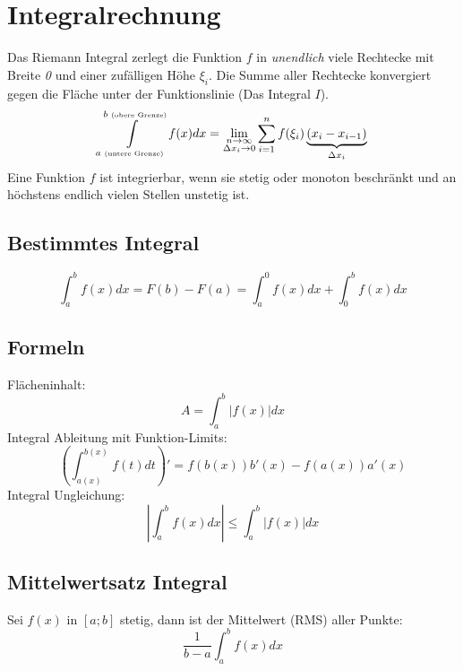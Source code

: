 \section{Integralrechnung}
Das Riemann Integral zerlegt die Funktion $f$ in \textit{unendlich} viele Rechtecke mit Breite \textit{0} und einer zufälligen Höhe $\xi_i$. Die Summe aller Rechtecke konvergiert gegen die Fläche unter der Funktionslinie (Das Integral $I$).
\[
\int\limits_{a \text{ \tiny(untere Grenze)}}^{b \text{ \tiny(obere Grenze)}}f(x)dx = \lim_{\substack{n\to\infty\\\Delta x_i\to 0}} \sum\limits_{i = 1}^{n}f(\xi_i)\underbrace{(x_i - x_{i-1})}_{\Delta x_i}
\]
\noindent Eine Funktion $f$ ist integrierbar, wenn sie stetig oder monoton beschränkt und an höchstens endlich vielen Stellen unstetig ist.

\subsection{Bestimmtes Integral}
\[\int_{a}^{b}f(x)dx = F(b) - F(a) = \int_{a}^{0}f(x)dx + \int_{0}^{b}f(x)dx\]

\subsection{Formeln}
\noindent Flächeninhalt: \[A = \int_{a}^{b}\left|f(x)\right|dx\]
\noindent Integral Ableitung mit Funktion-Limits: \[\left(\int_{a(x)}^{b(x)}f(t)dt\right)' = f(b(x))b'(x) - f(a(x))a'(x)\]
\noindent Integral Ungleichung:
\[\left|\int_{a}^{b}f(x)dx\right| \leq \int_{a}^{b}\left|f(x)\right|dx\]

\subsection{Mittelwertsatz Integral}
Sei $f(x)$ in $[a;b]$ stetig, dann ist der Mittelwert (RMS) aller Punkte:
\[\frac{1}{b-a}\int_{a}^{b}f(x)dx\]

